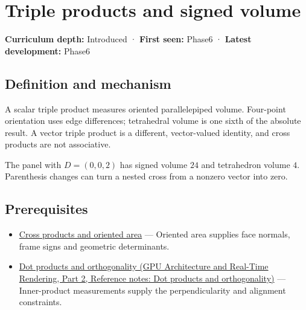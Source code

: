 \hypertarget{appendix-5caa058bd9c7}{}\label{referencestart:appendix-5caa058bd9c7}
\section{Triple products and signed volume}\label{appendix-5caa058bd9c7-triple-products-and-signed-volume}

\hypertarget{appendix-5caa058bd9c7-triple-products-and-signed-volume}{}

\textbf{Curriculum depth:} Introduced · \textbf{First seen:} Phase6 · \textbf{Latest development:} Phase6

\begin{allmightroledefinition}

\subsection{Definition and mechanism}\label{appendix-5caa058bd9c7-definition-and-mechanism}

\hypertarget{appendix-5caa058bd9c7-definition-and-mechanism}{}

A scalar triple product measures oriented parallelepiped volume. Four-point orientation uses edge differences; tetrahedral volume is one sixth of the absolute result. A vector triple product is a different, vector-valued identity, and cross products are not associative.

\end{allmightroledefinition}

The panel with \(D=(0,0,2)\) has signed volume \(24\) and tetrahedron volume \(4\). Parenthesis changes can turn a nested cross from a nonzero vector into zero.

\subsection{Prerequisites}\label{appendix-5caa058bd9c7-prerequisites}

\hypertarget{appendix-5caa058bd9c7-prerequisites}{}

\begin{itemize}
\tightlist
\item
  \hyperref[appendix-2391db8052b1]{Cross products and oriented area} --- Oriented area supplies face normals, frame signs and geometric determinants.
\item
  \href{../06-GPU-Architecture-and-Real-Time-Rendering-P02/main.pdf\#appendix-8bc4e8fc547c}{Dot products and orthogonality (GPU Architecture and Real-Time Rendering, Part 2, Reference notes: Dot products and orthogonality)} --- Inner-product measurements supply the perpendicularity and alignment constraints.
\end{itemize}

